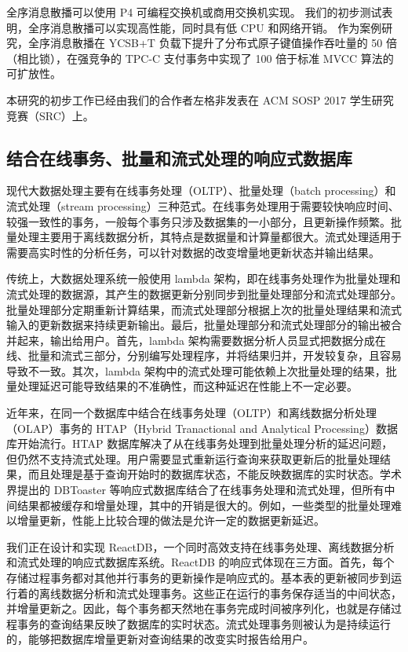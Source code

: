 全序消息散播可以使用 P4 可编程交换机或商用交换机实现。
我们的初步测试表明，全序消息散播可以实现高性能，同时具有低 CPU 和网络开销。
作为案例研究，全序消息散播在 YCSB+T 负载下提升了分布式原子键值操作吞吐量的 50 倍（相比锁），在强竞争的 TPC-C 支付事务中实现了 100 倍于标准 MVCC 算法的可扩放性。

本研究的初步工作已经由我们的合作者左格非发表在 ACM SOSP 2017 学生研究竞赛（SRC）上。

\subsection{结合在线事务、批量和流式处理的响应式数据库}

现代大数据处理主要有在线事务处理（OLTP）、批量处理（batch processing）和流式处理（stream processing）三种范式。在线事务处理用于需要较快响应时间、较强一致性的事务，一般每个事务只涉及数据集的一小部分，且更新操作频繁。批量处理主要用于离线数据分析，其特点是数据量和计算量都很大。流式处理适用于需要高实时性的分析任务，可以针对数据的改变增量地更新状态并输出结果。

传统上，大数据处理系统一般使用 lambda 架构，即在线事务处理作为批量处理和流式处理的数据源，其产生的数据更新分别同步到批量处理部分和流式处理部分。批量处理部分定期重新计算结果，而流式处理部分根据上次的批量处理结果和流式输入的更新数据来持续更新输出。最后，批量处理部分和流式处理部分的输出被合并起来，输出给用户。首先，lambda 架构需要数据分析人员显式把数据分成在线、批量和流式三部分，分别编写处理程序，并将结果归并，开发较复杂，且容易导致不一致。其次，lambda 架构中的流式处理可能依赖上次批量处理的结果，批量处理延迟可能导致结果的不准确性，而这种延迟在性能上不一定必要。

近年来，在同一个数据库中结合在线事务处理（OLTP）和离线数据分析处理（OLAP）事务的 HTAP（Hybrid Tranactional and Analytical Processing）数据库开始流行。HTAP 数据库解决了从在线事务处理到批量处理分析的延迟问题，但仍然不支持流式处理。用户需要显式重新运行查询来获取更新后的批量处理结果，而且处理是基于查询开始时的数据库状态，不能反映数据库的实时状态。学术界提出的 DBToaster 等响应式数据库结合了在线事务处理和流式处理，但所有中间结果都被缓存和增量处理，其中的开销是很大的。例如，一些类型的批量处理难以增量更新，性能上比较合理的做法是允许一定的数据更新延迟。

我们正在设计和实现 ReactDB，一个同时高效支持在线事务处理、离线数据分析和流式处理的响应式数据库系统。ReactDB 的响应式体现在三方面。首先，每个存储过程事务都对其他并行事务的更新操作是响应式的。基本表的更新被同步到运行着的离线数据分析和流式处理事务。这些正在运行的事务保存适当的中间状态，并增量更新之。因此，每个事务都天然地在事务完成时间被序列化，也就是存储过程事务的查询结果反映了数据库的实时状态。流式处理事务则被认为是持续运行的，能够把数据库增量更新对查询结果的改变实时报告给用户。

